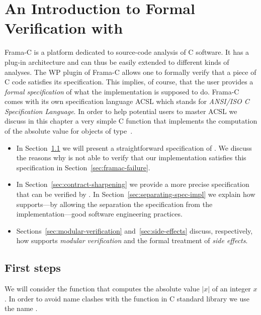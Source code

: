 
\chapter{An Introduction to Formal Verification with \framacwp}
\label{sec:frama-c}

Frama-C is a platform dedicated to source-code analysis of C software.
It has a plug-in architecture and can thus be easily extended to 
different kinds of analyses.
The WP plugin of Frama-C allows one to formally verify that a piece of
C code satisfies its specification.
This implies, of course, that the user provides a \emph{formal specification}
of what the implementation is supposed to do.
Frama-C comes with its own specification language ACSL which stands for
\emph{ANSI\slash ISO C Specification Language}.
In order to help potential users to master ACSL we discuss in this chapter 
a very simple C function  that implements the computation of
the absolute value for objects of type~.

\begin{itemize}
\item
In Section~\ref{sec:first-steps} we will present a straightforward
specification of .
We discuss the reasons why \framacwp is not able to verify that our
implementation satisfies this specification in Section~\ref{sec:framac-failure}.

\item 
In Section~\ref{sec:contract-sharpening} we provide a more precise
specification that can be verified by \framacwp.
In Section~\ref{sec:separating-spec-impl} we explain
how \framac supports---by allowing the separation the specification from the 
implementation---good software engineering practices.

\item
Sections~\ref{sec:modular-verification} and~\ref{sec:side-effects}
discuss, respectively,
how \framacwp supports \emph{modular verification} and the
formal treatment of \emph{side effects}.
\end{itemize}

\clearpage

\section{First steps}
\label{sec:first-steps}

We will consider the function that computes the absolute value $|x|$
of an integer $x$.
In order to avoid name clashes with the function  in C standard library
we use the name .

